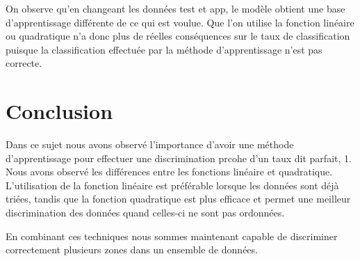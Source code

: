 \documentclass[a4paper,12pt]{report}
\begin{document}
On observe qu'en changeant les données test et app, le modèle obtient une base d'apprentissage différente de ce qui est voulue. Que l'on utilise la fonction linéaire ou quadratique n'a donc plus de réelles conséquences sur le taux de classification puisque la classification effectuée par la méthode d'apprentissage n'est pas correcte.

\newpage
\section*{Conclusion}

Dans ce sujet nous avons observé l'importance d'avoir une méthode d'apprentissage pour effectuer une discrimination prcohe d'un taux dit parfait, 1. Nous avons observé les différences entre les fonctions linéaire et quadratique. L'utilisation de la fonction linéaire est préférable lorsque les données sont déjà triées, tandis que la fonction quadratique est plus efficace et permet une meilleur discrimination des données quand celles-ci ne sont pas ordonnées.

En combinant ces techniques nous sommes maintenant capable de discriminer correctement plusieurs zones dans un ensemble de données.
\end{document}
